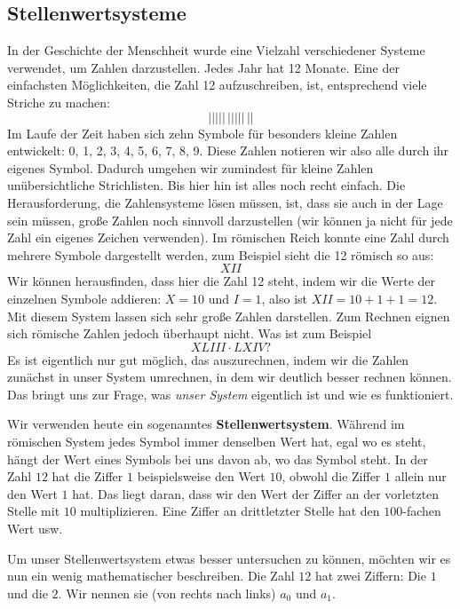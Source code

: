 \documentclass[../../main.tex]{subfiles}
\begin{document}
\subsection*{Stellenwertsysteme}
In der Geschichte der Menschheit wurde eine Vielzahl verschiedener Systeme verwendet, um Zahlen darzustellen. Jedes Jahr hat 12 Monate. Eine der einfachsten Möglichkeiten, die Zahl 12 aufzuschreiben, ist, entsprechend viele Striche zu machen:
\[|||||\,|||||\,||\]
Im Laufe der Zeit haben sich zehn Symbole für besonders kleine Zahlen entwickelt: 0, 1, 2, 3, 4, 5, 6, 7, 8, 9. Diese Zahlen notieren wir also alle durch ihr eigenes Symbol. Dadurch umgehen wir zumindest für kleine Zahlen unübersichtliche Strichlisten. Bis hier hin ist alles noch recht einfach. Die Herausforderung, die Zahlensysteme lösen müssen, ist, dass sie auch in der Lage sein müssen, große Zahlen noch sinnvoll darzustellen (wir können ja nicht für jede Zahl ein eigenes Zeichen verwenden). Im römischen Reich konnte eine Zahl durch mehrere Symbole dargestellt werden, zum Beispiel sieht die 12 römisch so aus:
\[XII\]
Wir können herausfinden, dass hier die Zahl 12 steht, indem wir die Werte der einzelnen Symbole addieren: $X=10$ und $I=1$, also ist $XII=10+1+1=12$. Mit diesem System lassen sich sehr große Zahlen darstellen. Zum Rechnen eignen sich römische Zahlen jedoch überhaupt nicht. Was ist zum Beispiel
\[XLIII\cdot LXIV?\]
Es ist eigentlich nur gut möglich, das auszurechnen, indem wir die Zahlen zunächst in unser System umrechnen, in dem wir deutlich besser rechnen können. Das bringt uns zur Frage, was \emph{unser System} eigentlich ist und wie es funktioniert.

Wir verwenden heute ein sogenanntes \textbf{Stellenwertsystem}. Während im römischen System jedes Symbol immer denselben Wert hat, egal wo es steht, hängt der Wert eines Symbols bei uns davon ab, wo das Symbol steht. In der Zahl $12$ hat die Ziffer $1$ beispielsweise den Wert $10$, obwohl die Ziffer $1$ allein nur den Wert $1$ hat. Das liegt daran, dass wir den Wert der Ziffer an der vorletzten Stelle mit $10$ multiplizieren. Eine Ziffer an drittletzter Stelle hat den $100$-fachen Wert usw.

Um unser Stellenwertsystem etwas besser untersuchen zu können, möchten wir es nun ein wenig mathematischer beschreiben. Die Zahl $12$ hat zwei Ziffern: Die $1$ und die $2$. Wir nennen sie (von rechts nach links) $a_0$ und $a_1$. 
\end{document}
